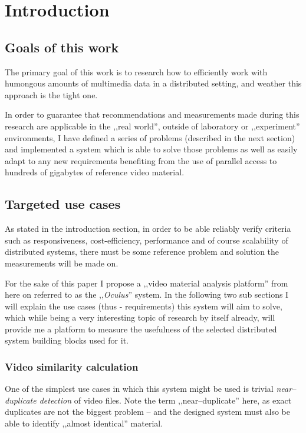 \chapter{Introduction}



\section{Goals of this work}
The primary goal of this work is to research how to efficiently work with humongous amounts of multimedia data in a distributed setting, and weather this approach is the tight one.

In order to guarantee that recommendations and measurements made during this research are applicable in the ,,real world'', outside of laboratory or ,,experiment'' environments, I have defined a series of problems (described in the next section) and implemented a system which is able to solve those problems as well as easily adapt to any new requirements benefiting from the use of parallel access to hundreds of gigabytes of reference video material.

\section{Targeted use cases}

As stated in the introduction section, in order to be able reliably verify criteria such as responsiveness, cost-efficiency, performance and of course scalability of distributed systems, there must be some reference problem and solution the measurements will be made on. 

For the sake of this paper I propose a ,,video material analysis platform'' from here on referred to as the ,,\textit{Oculus}'' system.
In the following two sub sections I will explain the use cases (thus - requirements) this system will aim to solve, which while being a very interesting 
topic of research by itself already, will provide me a platform to measure the usefulness of the selected distributed system building blocks used for it. 

\subsection{Video similarity calculation}
One of the simplest use cases in which this system might be used is trivial \textit{near--duplicate detection} of video files.
Note the term ,,near--duplicate'' here, as exact duplicates are not the biggest problem -- and the designed system must also be able to identify ,,almost identical'' material.

